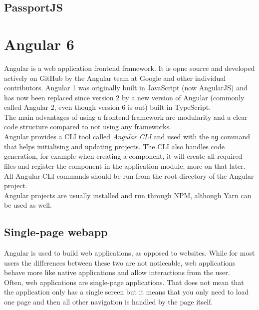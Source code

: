 \documentclass[11pt,a4paper]{report}
\begin{document}
\subsection{PassportJS}

\section{Angular 6}

Angular\cite{angular:website} is a web application frontend framework. It is opne source and developed actively on GitHub\cite{github:angular} by the Angular team at Google and other individual contributors. Angular 1 was originally built in JavaScript (now AngularJS) and has now been replaced since version 2 by a new version of Angular (commonly called Angular 2, even though version 6 is out) built in TypeScript. \\

The main advantages of using a frontend framework are modularity and a clear code structure compared to not using any frameworks. \\

Angular provides a CLI tool called \emph{Angular CLI} and used with the \verb+ng+ command that helps initialising and updating projects. The CLI also handles code generation, for example when creating a component, it will create all required files and register the component in the application module, more on that later. All Angular CLI commands should be run from the root directory of the Angular project. \\

Angular projects are usually installed and run through NPM, although Yarn can be used as well.
\subsection{Single-page webapp}
Angular is used to build web applications, as opposed to websites. While for most users the differences between these two are not noticeable, web applications behave more like native applications and allow interactions from the user.\\

Often, web applications are single-page applications. That does not mean that the application only has a single screen but it means that you only need to load one page and then all other navigation is handled by the page itself.
\end{document}
